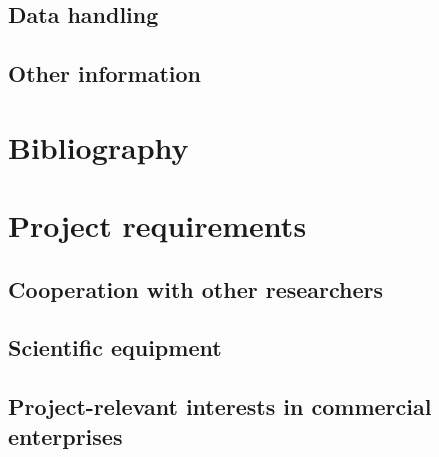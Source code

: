 \documentclass[11pt]{article}
\begin{document}
\subsection{Data handling}
\subsection{Other information}

\section{Bibliography}




\section{Project requirements}
\subsection{Cooperation with other researchers}
\subsection{Scientific equipment}

\subsection{Project-relevant interests in commercial enterprises}
\end{document}
